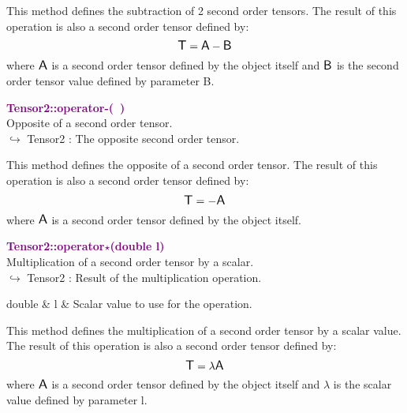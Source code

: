 This method defines the subtraction of 2 second order tensors.
The result of this operation is also a second order tensor defined by:
\begin{equation*}
\mbox{\large\ensuremath{\mathsf{T}}} = \mbox{\large\ensuremath{\mathsf{A}}} - \mbox{\large\ensuremath{\mathsf{B}}}
\end{equation*}
where $\mbox{\large\ensuremath{\mathsf{A}}}$ is a second order tensor defined by the object itself and $\mbox{\large\ensuremath{\mathsf{B}}}$ is the second order tensor value defined by parameter B.

\textcolor{purple}{\textbf{Tensor2::operator-(~)}}\label{Tensor2::operator-()}\\
Opposite of a second order tensor.\\ \hspace*{10mm}$\hookrightarrow$ Tensor2 : The opposite second order tensor.

This method defines the opposite of a second order tensor.
The result of this operation is also a second order tensor defined by:
\begin{equation*}
\mbox{\large\ensuremath{\mathsf{T}}} = - \mbox{\large\ensuremath{\mathsf{A}}}
\end{equation*}
where $\mbox{\large\ensuremath{\mathsf{A}}}$ is a second order tensor defined by the object itself.

\textcolor{purple}{\textbf{Tensor2::operator$\star$(double l)}}\label{Tensor2::operator*(double l)}\\
Multiplication of a second order tensor by a scalar.\\ \hspace*{10mm}$\hookrightarrow$ Tensor2 : Result of the multiplication operation.

\begin{tcolorbox}[width=\textwidth,myArgs,tabularx={ll|R}]
double & l & Scalar value to use for the operation.
\end{tcolorbox}

This method defines the multiplication of a second order tensor by a scalar value.
The result of this operation is also a second order tensor defined by:
\begin{equation*}
\mbox{\large\ensuremath{\mathsf{T}}} = \lambda \mbox{\large\ensuremath{\mathsf{A}}}
\end{equation*}
where $\mbox{\large\ensuremath{\mathsf{A}}}$ is a second order tensor defined by the object itself and $\lambda$ is the scalar value defined by parameter l.

